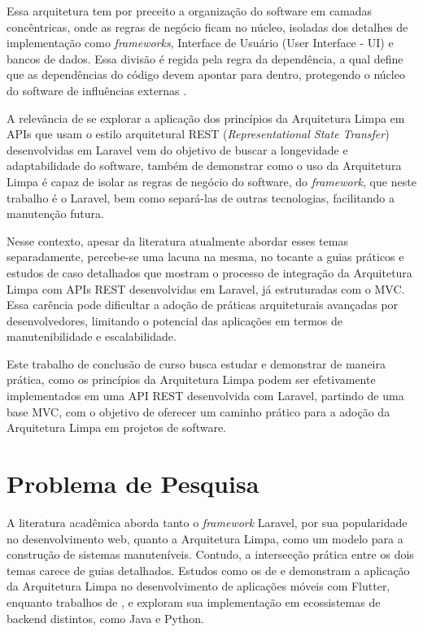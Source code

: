         \par Essa arquitetura tem por preceito a organização do software em camadas concêntricas, onde as regras de negócio ficam no núcleo, isoladas dos detalhes de implementação como \textit{frameworks}, Interface de Usuário (User Interface - UI) e bancos de dados. Essa divisão é regida pela regra da dependência, a qual define que as dependências  do código devem apontar para dentro, protegendo o núcleo do software de influências externas \cite{livro:martin:cleanarch}.
        
        \par A relevância de se explorar a aplicação dos princípios da Arquitetura Limpa em APIs que usam o estilo arquitetural REST (\textit{Representational State Transfer}) desenvolvidas em Laravel vem do objetivo de buscar a longevidade e adaptabilidade do software, também de demonstrar como o uso da Arquitetura Limpa é capaz de isolar as regras de negócio do software, do \textit{framework}, que neste trabalho é o Laravel, bem como separá-las de outras tecnologias, facilitando a manutenção futura.
        
        \par Nesse contexto, apesar da literatura atualmente abordar esses temas separadamente, percebe-se uma lacuna na mesma, no tocante a guias práticos e estudos de caso detalhados que mostram o processo de integração da Arquitetura Limpa com APIs REST desenvolvidas em Laravel, já estruturadas com o MVC. Essa carência pode dificultar a adoção de práticas arquiteturais avançadas por desenvolvedores, limitando o potencial das aplicações em termos de manutenibilidade e escalabilidade.
        
        \par Este trabalho de conclusão de curso busca estudar e demonstrar de maneira prática, como os princípios da Arquitetura Limpa podem ser efetivamente implementados em uma API REST desenvolvida com Laravel, partindo de uma base MVC, com o objetivo de oferecer um caminho prático para a adoção da Arquitetura Limpa em projetos de software.

    \section{Problema de Pesquisa}
        \par A literatura acadêmica aborda tanto o \textit{framework} Laravel, por sua popularidade no desenvolvimento web, quanto a Arquitetura Limpa, como um modelo para a construção de sistemas manuteníveis. Contudo, a intersecção prática entre os dois temas carece de guias detalhados. Estudos como os de \cite{relacionado:bueno:2021} e \cite{relacionado:pinto:2021} demonstram a aplicação da Arquitetura Limpa no desenvolvimento de aplicações móveis com Flutter, enquanto trabalhos de \cite{artigo:souza:2021:clean}, \cite{relacionado:boff:2023} e \cite{inproceedings:isha:2023} exploram sua implementação em ecossistemas de backend distintos, como Java e Python. 
        
